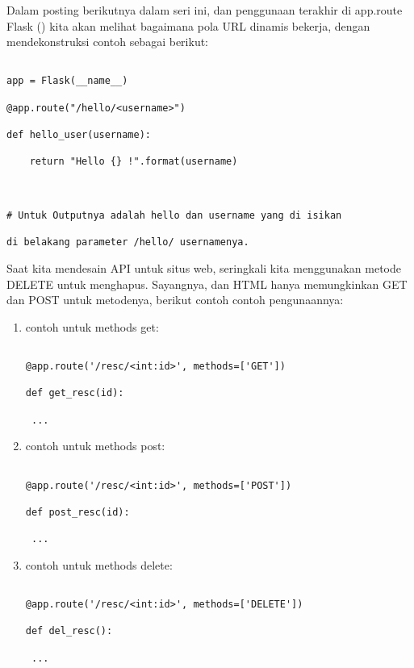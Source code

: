 \documentclass[12pt,a4paper]{article}
\begin{document}
Dalam posting berikutnya dalam seri ini, dan penggunaan terakhir di app.route Flask () kita akan melihat bagaimana pola URL dinamis bekerja, dengan mendekonstruksi contoh sebagai berikut:



\begin{verbatim}

app = Flask(__name__)

@app.route("/hello/<username>")

def hello_user(username):

    return "Hello {} !".format(username)

    

# Untuk Outputnya adalah hello dan username yang di isikan 

di belakang parameter /hello/ usernamenya.

\end{verbatim}



Saat kita mendesain API untuk situs web, seringkali kita menggunakan metode DELETE untuk menghapus. Sayangnya, dan HTML hanya memungkinkan GET dan POST untuk metodenya, berikut contoh contoh pengunaannya:



\begin{enumerate}

\item contoh untuk methods get:

\begin{verbatim} 

@app.route('/resc/<int:id>', methods=['GET'])

def get_resc(id):

 ...

\end{verbatim}



\item contoh untuk methods post:

\begin{verbatim} 

@app.route('/resc/<int:id>', methods=['POST'])

def post_resc(id):

 ...

\end{verbatim}



\item contoh untuk methods delete:

\begin{verbatim} 

@app.route('/resc/<int:id>', methods=['DELETE'])

def del_resc():

 ...

\end{verbatim}

\end{enumerate}
\end{document}
